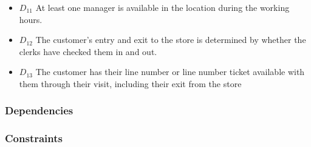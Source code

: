 \begin{itemize}
    \item \textbf{$D_{11}$} At least one manager is available in the location during the working hours. %
    \item \textbf{$D_{12}$} The customer's entry and exit to the store is determined by whether the clerks have checked them in and out.
    \item \textbf{$D_{13}$} The customer has their line number or line number ticket available with them through their visit, including their exit from the store %
\end{itemize}
\subsubsection{Dependencies}
\subsubsection{Constraints}
